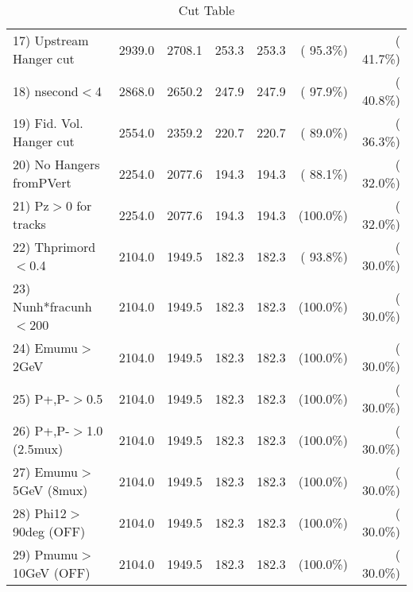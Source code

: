 \begin{table}[h!]
\begin{tabular}{||l||r|r|r|r|r|r||}
 17) Upstream Hanger cut  &       2939.0 &       2708.1 &        253.3 &        253.3 & ( 95.3\%) & ( 41.7\%) \\
 18) nsecond$<$4          &       2868.0 &       2650.2 &        247.9 &        247.9 & ( 97.9\%) & ( 40.8\%) \\
 19) Fid. Vol. Hanger cut &       2554.0 &       2359.2 &        220.7 &        220.7 & ( 89.0\%) & ( 36.3\%) \\
 20) No Hangers fromPVert &       2254.0 &       2077.6 &        194.3 &        194.3 & ( 88.1\%) & ( 32.0\%) \\
 21) Pz$>$0 for tracks    &       2254.0 &       2077.6 &        194.3 &        194.3 & (100.0\%) & ( 32.0\%) \\
 22) Thprimord$<$0.4      &       2104.0 &       1949.5 &        182.3 &        182.3 & ( 93.8\%) & ( 30.0\%) \\
 23) Nunh*fracunh$<$200   &       2104.0 &       1949.5 &        182.3 &        182.3 & (100.0\%) & ( 30.0\%) \\
 24) Emumu$>$2GeV         &       2104.0 &       1949.5 &        182.3 &        182.3 & (100.0\%) & ( 30.0\%) \\
 25) P+,P-$>$0.5          &       2104.0 &       1949.5 &        182.3 &        182.3 & (100.0\%) & ( 30.0\%) \\
 26) P+,P-$>$1.0 (2.5mux) &       2104.0 &       1949.5 &        182.3 &        182.3 & (100.0\%) & ( 30.0\%) \\
 27) Emumu$>$5GeV  (8mux) &       2104.0 &       1949.5 &        182.3 &        182.3 & (100.0\%) & ( 30.0\%) \\
 28) Phi12$>$90deg  (OFF) &       2104.0 &       1949.5 &        182.3 &        182.3 & (100.0\%) & ( 30.0\%) \\
 29) Pmumu$>$10GeV  (OFF) &       2104.0 &       1949.5 &        182.3 &        182.3 & (100.0\%) & ( 30.0\%) \\
 \hline
 \hline
 \end{tabular}
 \caption{Cut Table           }
 \label{tab-cutcohjpsi-mumu_anumucc}
 \end{table}
